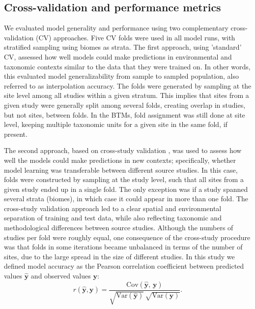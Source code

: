 
\subsection*{Cross-validation and performance metrics}

We evaluated model generality and performance using two complementary cross-validation (CV) approaches. Five CV folds were used in all model runs, with stratified sampling using biomes as strata. The first approach, using 'standard' CV, assessed how well models could make predictions in environmental and taxonomic contexts similar to the data that they were trained on. In other words, this evaluated model generalizability from sample to sampled population, also referred to as interpolation accuracy. The folds were generated by sampling at the site level among all studies within a given stratum. This implies that sites from a given study were generally split among several folds, creating overlap in studies, but not sites, between folds. In the BTMs, fold assignment was still done at site level, keeping multiple taxonomic units for a given site in the same fold, if present.

The second approach, based on cross-study validation \cite{bernau2014}, was used to assess how well the models could make predictions in new contexts; specifically, whether model learning was transferable between different source studies. In this case, folds were constructed by sampling at the study level, such that all sites from a given study ended up in a single fold. The only exception was if a study spanned several strata (biomes), in which case it could appear in more than one fold. The cross-study validation approach led to a clear spatial and environmental separation of training and test data, while also reflecting taxonomic and methodological differences between source studies. Although the numbers of studies per fold were roughly equal, one consequence of the cross-study procedure was that folds in some iterations became unbalanced in terms of the number of sites, due to the large spread in the size of different studies. In this study we defined model accuracy as the Pearson correlation coefficient between predicted values $\widehat{\mathbf{y}}$ and observed values $\mathbf{y}$:
\vspace{0.25\baselineskip}
\begin{equation*}
    r(\widehat{\mathbf{y}}, \mathbf{y}) = \frac{\text{Cov}(\widehat{\mathbf{y}},\, \mathbf{y})} {\sqrt{\text{Var}(\widehat{\mathbf{y}})} \, \sqrt{\text{Var}(\mathbf{y})}}.
\end{equation*}


